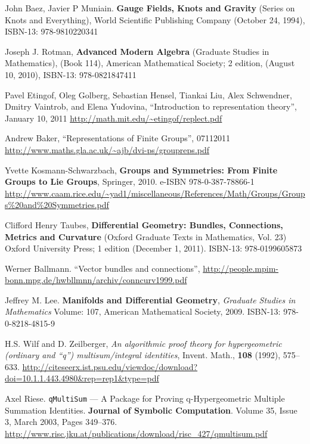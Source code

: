 \documentclass[10pt]{amsart}
\begin{document}
\begin{thebibliography}{9}

John Baez, Javier P Muniain.  \textbf{Gauge Fields, Knots and Gravity} (Series on Knots and Everything), World Scientific Publishing Company (October 24, 1994), ISBN-13: 978-9810220341

Joseph J. Rotman, \textbf{Advanced Modern Algebra} (Graduate Studies in Mathematics), (Book 114), American Mathematical Society; 2 edition, (August 10, 2010), ISBN-13: 978-0821847411

Pavel Etingof, Oleg Golberg, Sebastian Hensel, Tiankai Liu, Alex Schwendner, Dmitry Vaintrob, and Elena Yudovina, ``Introduction to representation theory'', January 10, 2011
\url{http://math.mit.edu/~etingof/replect.pdf}

Andrew Baker, ``Representations of Finite Groups'', 07112011
\url{http://www.maths.gla.ac.uk/~ajb/dvi-ps/groupreps.pdf}

Yvette Kosmann-Schwarzbach, \textbf{Groups and Symmetries: From Finite Groups to Lie Groups}, Springer, 2010. e-ISBN 978-0-387-78866-1 \url{http://www.caam.rice.edu/~yad1/miscellaneous/References/Math/Groups/Groups\%20and\%20Symmetries.pdf}

Clifford Henry Taubes, \textbf{Differential Geometry: Bundles, Connections, Metrics and Curvature} (Oxford Graduate Texts in Mathematics, Vol. 23) Oxford University Press; 1 edition (December 1, 2011). ISBN-13: 978-0199605873

Werner Ballmann. ``Vector bundles and connections'', \url{http://people.mpim-bonn.mpg.de/hwbllmnn/archiv/conncurv1999.pdf}

Jeffrey M. Lee. \textbf{Manifolds and Differential Geometry}, \emph{Graduate Studies in Mathematics} Volume: 107, American Mathematical Society, 2009. ISBN-13: 978-0-8218-4815-9

H.S. Wilf and D. Zeilberger, \emph{An algorithmic proof theory for hypergeometric (ordinary and “q”) multisum/integral identities}, Invent. Math., \textbf{108} (1992), 575–633.  \url{http://citeseerx.ist.psu.edu/viewdoc/download?doi=10.1.1.443.4980&rep=rep1&type=pdf}

Axel Riese.  \verb|qMultiSum| — A Package for Proving q-Hypergeometric Multiple Summation Identities. \textbf{Journal of Symbolic Computation}. Volume 35, Issue 3, March 2003, Pages 349–376.  \url{http://www.risc.jku.at/publications/download/risc_427/qmultisum.pdf}


\end{thebibliography}
\end{document}
